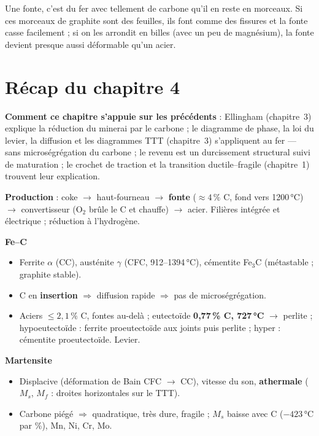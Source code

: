\begin{goatbox}
Une fonte, c'est du fer avec tellement de carbone qu'il en reste en morceaux. Si ces morceaux de
graphite sont des feuilles, ils font comme des fissures et la fonte casse facilement ; si on les
arrondit en billes (avec un peu de magnésium), la fonte devient presque aussi déformable qu'un
acier.
\end{goatbox}

\section*{Récap du chapitre 4}

\begin{recapbox}
\textbf{Comment ce chapitre s'appuie sur les précédents} : Ellingham (chapitre~3) explique la
réduction du minerai par le carbone ; le diagramme de phase, la loi du levier, la diffusion et
les diagrammes TTT (chapitre~3) s'appliquent au fer --- sans microségrégation du carbone ; le
revenu est un durcissement structural suivi de maturation ; le crochet de traction et la
transition ductile--fragile (chapitre~1) trouvent leur explication.

\textbf{Production} : coke $\to$ haut-fourneau $\to$ \textbf{fonte} ($\approx 4\,\%$ C, fond vers
1200\,°C) $\to$ convertisseur (O$_2$ brûle le C et chauffe) $\to$ acier. Filières intégrée et
électrique ; réduction à l'hydrogène.

\textbf{Fe--C}
\begin{itemize}
  \item Ferrite $\alpha$ (CC), austénite $\gamma$ (CFC, 912--1394\,°C), cémentite Fe$_3$C
        (métastable ; graphite stable).
  \item C en \textbf{insertion} $\Rightarrow$ diffusion rapide $\Rightarrow$ pas de microségrégation.
  \item Aciers $\le 2{,}1\,\%$ C, fontes au-delà ; eutectoïde \textbf{0,77\,\% C, 727\,°C}
        $\to$ perlite ; hypoeutectoïde : ferrite proeutectoïde aux joints puis perlite ;
        hyper : cémentite proeutectoïde. Levier.
\end{itemize}

\textbf{Martensite}
\begin{itemize}
  \item Displacive (déformation de Bain CFC $\to$ CC), vitesse du son, \textbf{athermale}
        ($M_s$, $M_f$ : droites horizontales sur le TTT).
  \item Carbone piégé $\Rightarrow$ quadratique, très dure, fragile ; $M_s$ baisse avec C
        ($-423$\,°C par \%), Mn, Ni, Cr, Mo.
\end{itemize}


\end{recapbox}

